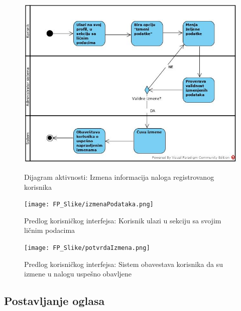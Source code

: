 \documentclass[20pt]{article}
\begin{document}
\begin{figure}[h]
        \centering
        \includegraphics[width=1.1\textwidth,height=0.74\textheight]{Pictures/IzmenaInformacijaNalogaKorisnika.jpg}\\
        \caption{Dijagram aktivnosti: Izmena informacija naloga registrovanog korisnika}
        \label{fig:dijagramAktivnostiIzmenaNaloga}
    \end{figure}
\newpage
\begin{figure}[h]
        \centering
        \texttt{[image: FP\_Slike/izmenaPodataka.png]}\\
        \caption{Predlog korisni\v ckog interfejsa: Korisnik ulazi u sekciju sa svojim li\v cnim podacima}
    \end{figure}
\newpage
\begin{figure}[h]
        \centering
        \texttt{[image: FP\_Slike/potvrdaIzmena.png]}\\
        \caption{Predlog korisni\v ckog interfejsa: Sistem obavestava korisnika da su izmene u nalogu uspe\v sno obavljene}
    \end{figure}
\newpage
\subsection{\bfseries \Large Postavljanje oglasa}
\setlength{\parindent}{1cm}
\fontsize{13}{18} \selectfont 
\end{document}
